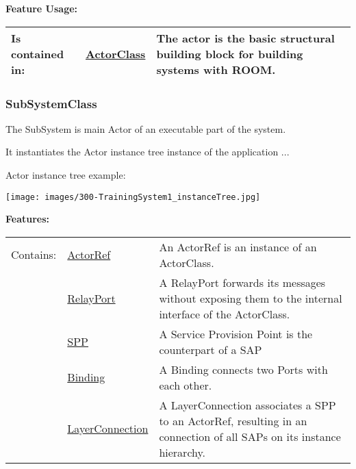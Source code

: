 		\begingroup
		\textbf{Feature Usage:}
		\renewcommand{\arraystretch}{1.8} %
		\begin{longtable}{l|l p{}}
			\hline
		Is contained in: & \tabitem \hyperlink{ref:ActorClass}{ActorClass}  & The actor is the basic structural building block for building systems with ROOM.\\
		\hline
		\end{longtable}
		\endgroup
		
		
	\vspace{\baselineskip}
	\vspace{\baselineskip}
	\vspace{\baselineskip}
	
	\subsubsection{SubSystemClass}
		\hypertarget{ref:SubSystemClass}{}
		
		The SubSystem is main Actor of an executable part of the system. 
		
		It instantiates the Actor instance tree instance of the application ...
		
		Actor instance tree example:
		
		\texttt{[image: images/300-TrainingSystem1\_instanceTree.jpg]}
		
		
		\begingroup
		\textbf{Features:}
		\renewcommand{\arraystretch}{1.8} %
		\begin{longtable}{l|l p{}}
			\hline
		Contains: & \tabitem \hyperlink{ref:ActorRef}{ActorRef}  & An ActorRef is an instance of an ActorClass.\\
		& \tabitem \hyperlink{ref:RelayPort}{RelayPort}  & A RelayPort forwards its messages without exposing them to the internal interface of the ActorClass. \\
		& \tabitem \hyperlink{ref:SPP}{SPP}  & A Service Provision Point is the counterpart of a SAP \\
		& \tabitem \hyperlink{ref:Binding}{Binding}  & A Binding connects two Ports with each other. \\
		& \tabitem \hyperlink{ref:LayerConnection}{LayerConnection}  & A LayerConnection associates a SPP to an ActorRef, resulting in an connection of all SAPs on its instance hierarchy. \\
		\hline
		\end{longtable}
		\endgroup
		
